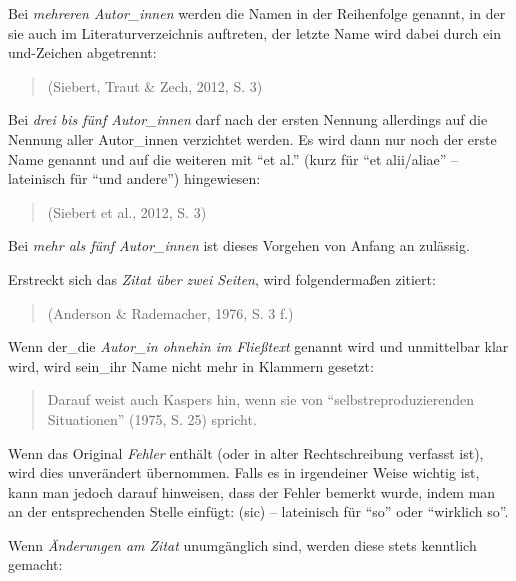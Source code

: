 \documentclass[
  bibliography=totoc,
  oneside,
  12pt,
  a4paper]{scrbook}
\begin{document}
Bei \emph{mehreren Autor\_innen} werden die Namen in der Reihenfolge genannt,
in der sie auch im Literaturverzeichnis auftreten, der letzte Name wird
dabei durch ein und-Zeichen abgetrennt:

\begin{quote}
(Siebert, Traut \& Zech, 2012, S. 3)
\end{quote}

Bei \emph{drei bis fünf Autor\_innen} darf nach der ersten Nennung allerdings
auf die Nennung aller Autor\_innen verzichtet werden. Es wird dann nur
noch der erste Name genannt und auf die weiteren mit ``et al.'' (kurz für
``et alii/aliae'' -- lateinisch für ``und andere'') hingewiesen:

\begin{quote}
(Siebert et al., 2012, S. 3)
\end{quote}

Bei \emph{mehr als fünf Autor\_innen} ist dieses Vorgehen von Anfang an
zulässig.

Erstreckt sich das \emph{Zitat über zwei Seiten}, wird folgendermaßen
zitiert:

\begin{quote}
(Anderson \& Rademacher, 1976, S. 3 f.)
\end{quote}

Wenn der\_die \emph{Autor\_in ohnehin im Fließtext} genannt wird und
unmittelbar klar wird, wird sein\_ihr Name nicht mehr in Klammern
gesetzt:

\begin{quote}
Darauf weist auch Kaspers hin, wenn sie von ``selbstreproduzierenden
Situationen'' (1975, S. 25) spricht.
\end{quote}

Wenn das Original \emph{Fehler} enthält (oder in alter Rechtschreibung
verfasst ist), wird dies unverändert übernommen. Falls es in irgendeiner
Weise wichtig ist, kann man jedoch darauf hinweisen, dass der Fehler
bemerkt wurde, indem man an der entsprechenden Stelle einfügt: (sic) --
lateinisch für ``so'' oder ``wirklich so''.

Wenn \emph{Änderungen am Zitat} unumgänglich sind, werden diese stets
kenntlich gemacht:
\end{document}
